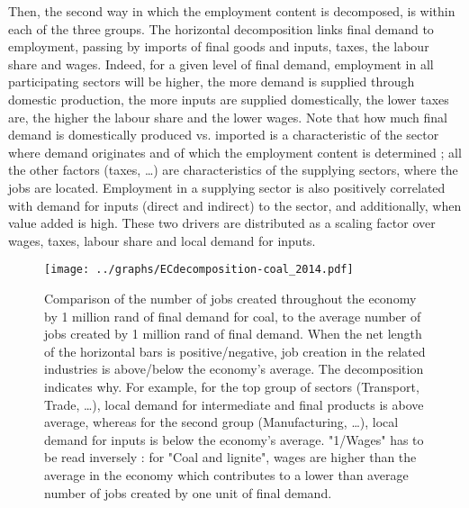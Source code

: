 \documentclass[12pt,english]{article}
\begin{document}
Then, the second way in which the employment content is decomposed, is within each of the three groups. The horizontal decomposition  links final demand to employment, passing by imports of final goods and inputs, taxes, the labour share and wages. Indeed, for a given level of final demand, employment in all participating sectors will be higher, the more demand is supplied through domestic production, the more inputs are supplied domestically, the lower taxes are, the higher the labour share and the lower wages. Note that how much final demand is domestically produced vs. imported is a characteristic of the sector where demand originates and of which the employment content is determined ; all the other factors (taxes, \ldots) are characteristics of the supplying sectors, where the jobs are located. Employment in a supplying sector is also positively correlated with demand for inputs (direct and indirect) to the sector, and additionally, when value added is high. These two drivers are distributed as a scaling factor over wages, taxes, labour share and local demand for inputs. 

\begin{figure}[!t]
	\centering
	\hspace{-16pt}\texttt{[image: ../graphs/ECdecomposition-coal\_2014.pdf]}
	\caption{\label{ECdecomposition-coal_2014}\small Comparison of the number of jobs created throughout the economy by 1 million rand of final demand for coal, to the average number of jobs created by 1 million rand of final demand. When the net length of the horizontal bars is positive/negative, job creation in the related industries is above/below the economy's average. The decomposition indicates why. For example, for the top group of sectors (Transport, Trade, \ldots), local demand for intermediate and final products is above average, whereas for the second group (Manufacturing, \ldots), local demand for inputs is below the economy's average. "1/Wages" has to be read inversely : for "Coal and lignite", wages are higher than the average in the economy which contributes to a lower than average number of jobs created by one unit of final demand. }
\end{figure}
\end{document}
